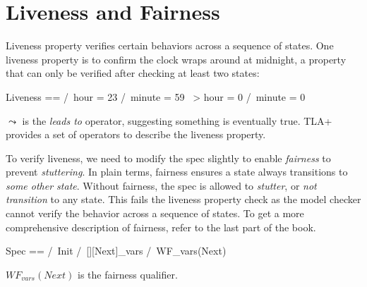 \section{Liveness and Fairness}

Liveness property verifies certain behaviors across a sequence of states. One
liveness property is to confirm the clock wraps around at midnight, a property
that can only be verified after checking at least two states: \newline

\begin{tla}
    Liveness ==
        /\ hour = 23 /\ minute = 59 ~> hour = 0 /\ minute = 0
\end{tla}
\begin{tlatex}
%
\end{tlatex}
\newline

$\leadsto$ is the \textit{leads to} operator, suggesting something is eventually
true. TLA+ provides a set of operators to describe the liveness property.\newline 

To verify liveness, we need to modify the spec slightly to enable
\textit{fairness} to prevent \textit{stuttering}. In plain terms, fairness
ensures a state always transitions to \textit{some other state}. Without fairness, the spec is allowed to \textit{stutter}, or \textit{not transition} to any state. This fails the liveness property check as the model checker cannot verify the behavior across a sequence of states. To get a more 
comprehensive description of fairness, refer to the last part of the
book.\newline

\begin{tla}
    Spec ==
        /\ Init
        /\ [][Next]_vars
        /\ WF_vars(Next)
\end{tla}
\begin{tlatex}
%
%
%
%
\end{tlatex}
\newline

$WF_{vars}(Next)$ is the fairness qualifier.



